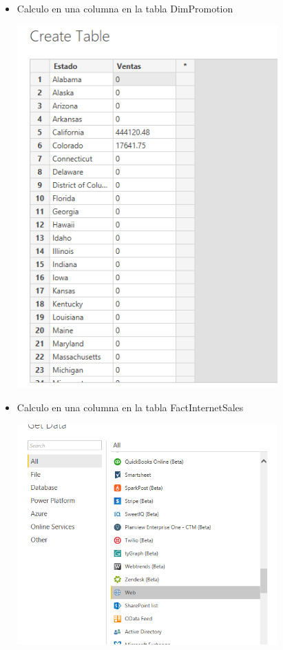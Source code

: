 \begin{itemize}
	\item Calculo en una columna en la tabla DimPromotion
	\begin{center}
	\includegraphics[width=10cm]{./Imagenes/6} 
	\end{center}
\end{itemize} 

\begin{itemize}
	\item Calculo en una columna en la tabla FactInternetSales
	\begin{center}
	\includegraphics[width=10cm]{./Imagenes/7} 
	\end{center}
\end{itemize} 


